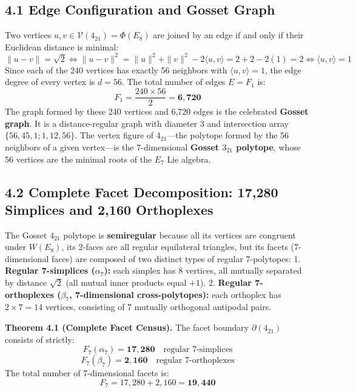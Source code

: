 \documentclass[11pt,twoside,openright]{amsbook}
\begin{document}
\subsection{4.1 Edge Configuration and Gosset Graph}

Two vertices $u, v \in \mathcal{V}(4_{21}) = \Phi(E_8)$ are joined by an edge if and only if their Euclidean distance is minimal:
$$\|u - v\| = \sqrt{2} \iff \|u - v\|^2 = \|u\|^2 + \|v\|^2 - 2\langle u, v \rangle = 2 + 2 - 2(1) = 2 \iff \langle u, v \rangle = 1$$
Since each of the 240 vertices has exactly 56 neighbors with $\langle u, v \rangle = 1$, the edge degree of every vertex is $d = 56$.
The total number of edges $E = F_1$ is:
$$F_1 = \frac{240 \times 56}{2} = \mathbf{6,720}$$
The graph formed by these 240 vertices and 6,720 edges is the celebrated \textbf{Gosset graph}. It is a distance-regular graph with diameter 3 and intersection array $\{56, 45, 1; 1, 12, 56\}$.
The vertex figure of $4_{21}$—the polytope formed by the 56 neighbors of a given vertex—is the 7-dimensional \textbf{Gosset $3_{21}$ polytope}, whose 56 vertices are the minimal roots of the $E_7$ Lie algebra.

\subsection{4.2 Complete Facet Decomposition: 17,280 Simplices and 2,160 Orthoplexes}

The Gosset $4_{21}$ polytope is \textbf{semiregular} because all its vertices are congruent under $W(E_8)$, its 2-faces are all regular equilateral triangles, but its facets (7-dimensional faces) are composed of two distinct types of regular 7-polytopes:
1. \textbf{Regular 7-simplices ($\alpha_7$):} each simplex has 8 vertices, all mutually separated by distance $\sqrt{2}$ (all mutual inner products equal $+1$).
2. \textbf{Regular 7-orthoplexes ($\beta_7$, 7-dimensional cross-polytopes):} each orthoplex has $2 \times 7 = 14$ vertices, consisting of 7 mutually orthogonal antipodal pairs.

\textbf{Theorem 4.1 (Complete Facet Census).} The facet boundary $\partial (4_{21})$ consists of strictly:
$$F_7(\alpha_7) = \mathbf{17,280} \quad \text{regular 7-simplices}$$
$$F_7(\beta_7) = \mathbf{2,160} \quad \text{regular 7-orthoplexes}$$
The total number of 7-dimensional facets is:
$$F_7 = 17,280 + 2,160 = \mathbf{19,440}$$
\end{document}
